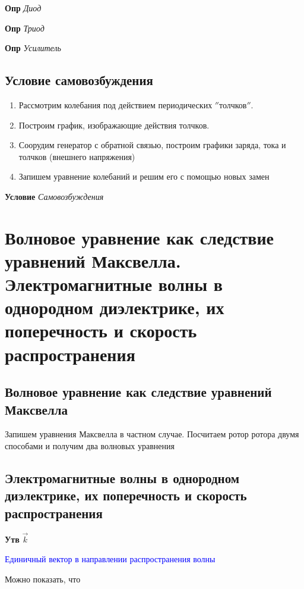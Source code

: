 \documentclass[a4paper, 14pt]{article}
\begin{document}
    \textbf{Опр} \textit{Диод}
    
    \textbf{Опр} \textit{Триод}
    
    \textbf{Опр} \textit{Усилитель}
    
    \subsection{Условие самовозбуждения}
    
    \begin{enumerate}
        \item Рассмотрим колебания под действием периодических \(''\)толчков\(''\).
        \item Построим график, изображающие действия толчков.
        \item Соорудим генератор с обратной связью, построим графики заряда, тока и толчков (внешнего напряжения)
        \item Запишем уравнение колебаний и решим его с помощью новых замен
    \end{enumerate}
    
    \textbf{Условие} \textit{Самовозбуждения}
    
    \section{Волновое уравнение как следствие уравнений Максвелла.
    Электромагнитные волны в однородном диэлектрике, их поперечность и скорость распространения}
    
    \subsection{Волновое уравнение как следствие уравнений Максвелла}
    
    Запишем уравнения Максвелла в частном случае.
    Посчитаем ротор ротора двумя способами и получим два волновых уравнения
    
    \subsection{Электромагнитные волны в однородном диэлектрике, их поперечность и скорость распространения}
    
    \textbf{Утв} \textit{$\overrightarrow{k}$}
    
    \textcolor{blue}{Единичный вектор в направлении распространения волны}
    
    Можно показать, что
    
\end{document}
